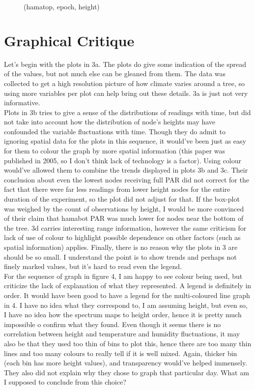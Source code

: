 \documentclass[english]{article}\usepackage[]{graphicx}\usepackage[]{color}
\begin{document}
\begin{figure}[H]
\begin{minipage}{.50\textwidth}
\caption{(hamatop, epoch, height)}
\label{fig:test2}
\end{minipage}
\end{figure}

\section{Graphical Critique}

Let's begin with the plots in 3a. The plots do give some indication of the spread of the values, but not much else can be gleaned from them.  The data was collected to get a high resolution picture of how climate varies around a tree, so using more variables per plot can help bring out these details.  3a is just not very informative.  \\

Plots in 3b tries to give a sense of the distributions of readings with time, but did not take into account how the distribution of node's heights may have confounded the variable fluctuations with time.  Though they do admit to ignoring spatial data for the plots in this sequence, it would've been just as easy for them to colour the graph by more spatial information (this paper was published in 2005, so I don't think lack of technology is a factor). Using colour would've allowed them to combine the trends displayed in plots 3b and 3c. Their conclusion about even the lowest nodes receiving full PAR did not correct for the fact that there were far less readings from lower height nodes for the entire duration of the experiment, so the plot did not adjust for that. If the box-plot was weighed by the count of observations by height, I would be more convinced of their claim that hamabot PAR was much lower for nodes near the bottom of the tree. 3d carries interesting range information, however the same criticism for lack of use of colour to highlight possible dependence on other factors (such as spatial information) applies.  Finally, there is no reason why the plots in 3 are should be so small.  I understand the point is to show trends and perhaps not finely marked values, but it's hard to read even the legend.  \\


For the sequence of graph in figure 4, I am happy to see colour being used, but criticize the lack of explanation of what they represented.  A legend is definitely in order.  It would have been good to have a legend for the multi-coloured line graph in 4.  I have no idea what they correspond to, I am assuming height, but even so, I have no idea how the spectrum maps to height order, hence it is pretty much impossible o confirm what they found.  Even though it seems there is no correlation between height and temperature and humidity fluctuations, it may also be that they used too thin of bins to plot this, hence there are too many thin lines and too many colours to really tell if it is well mixed.  Again, thicker bin (each bin has more height values), and transparency would've helped immensely.   They also did not explain why they chose to graph that particular day.  What am I supposed to conclude from this choice?  \\
\end{document}
